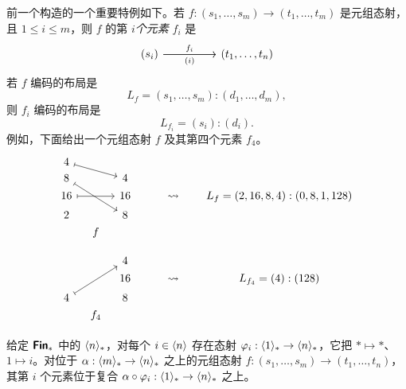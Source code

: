 \begin{example}[元素包含]\label{definitionofentriesoftuplemorphism}
    前一个构造的一个重要特例如下。若 $f:(s_1,\dots,s_m) \to (t_1,\dots,t_m)$ 是元组态射，且 $1 \leq i \leq m$，则 $f$ 的第 $i${\it 个元素} $f_i$ 是
\[\begin{tikzcd} (s_i) \ar[rr,"f_i"] \ar[rr,swap,"(i)"] & &  (t_1,\dots,t_n)
    \end{tikzcd} \]
    若 $f$ 编码的布局是
    \[L_f = (s_1,\dots,s_m):(d_1,\dots,d_m),\]
    则 $f_i$ 编码的布局是
    \[
    L_{f_i} = (s_i):(d_i).
    \]
    例如，下面给出一个元组态射 $f$ 及其第四个元素 $f_4$。
    \[ \begin{tikzcd} [row sep = 1, column sep = 8]
    4 \ar[rrd,mapsto] & & & & & & \\
    8 \ar[ddrr,mapsto] & & 4 & & & & \\
    16 \ar[rr,mapsto] & & 16 & & \rightsquigarrow & & L_f = (2,16,8,4):(0,8,1,128)\\
    2 & & 8 & & & & \\
    & f & & & & & \\
    & & & \vspace{5.0in} & & & \\
    & & & & & &  \\
    & & 4 & & & & \\
    & & 16 & & \rightsquigarrow & & L_{f_4} = (4):(128)\\
    4 \ar[uurr,mapsto] & & 8 & &  & & \\
    & f_4 & & & & & \\
    \end{tikzcd} \]
\end{example}

\begin{remark}
    给定 ${\boldsymbol{\mathsf{Fin}}}_*$ 中的 $\langle n \rangle_*$，对每个 $i \in \langle n \rangle$ 存在态射 $\varphi_i: \langle 1 \rangle_* \to \langle n \rangle_*$，它把 $* \mapsto *$、$1 \mapsto i$。对位于 $\alpha: \langle m \rangle_* \to \langle n \rangle_*$ 之上的元组态射 $f: (s_1, \dots, s_m) \to (t_1, \dots, t_n)$，其第 $i$ 个元素位于复合 $\alpha \circ \varphi_i: \langle 1 \rangle_* \to \langle n \rangle_*$ 之上。
\end{remark}

